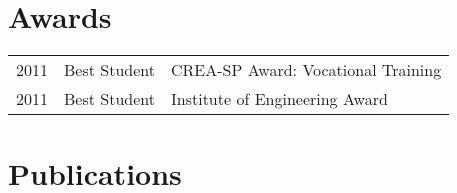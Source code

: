 \documentclass[]{resume}
\begin{document}
\begin{minipage}[t]{0.66\textwidth}

\section{Awards} 
\begin{tabular}{rll}
2011 & Best Student & CREA-SP Award: Vocational Training\\
2011 & Best Student & Institute of Engineering Award\\
\end{tabular}
\sectionsep


\section{Publications} 
\sectionsep
\sectionsep


\nocite{*}

\end{minipage} 
\end{document}
